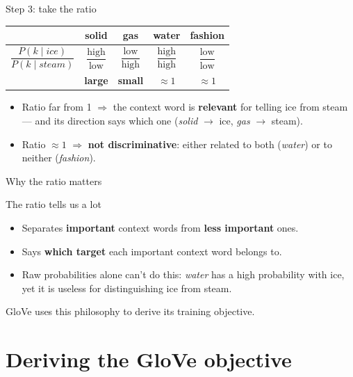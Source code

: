 \documentclass[aspectratio=169,11pt]{beamer}
\begin{document}
\begin{frame}{Step 3: take the ratio}
\centering
\begin{tabular}{@{}lcccc@{}}
\toprule
 & solid & gas & water & fashion \\
\midrule
$\dfrac{P(k \mid \textit{ice})}{P(k \mid \textit{steam})}$
  & $\dfrac{\text{high}}{\text{low}}$ & $\dfrac{\text{low}}{\text{high}}$
  & $\dfrac{\text{high}}{\text{high}}$ & $\dfrac{\text{low}}{\text{low}}$ \\[3mm]
  & \textcolor{okc}{\textbf{large}} & \textcolor{warn}{\textbf{small}}
  & $\approx 1$ & $\approx 1$ \\
\bottomrule
\end{tabular}

\vspace{4mm}
\raggedright
\begin{itemize}
  \item Ratio far from 1 $\Rightarrow$ the context word is \textbf{relevant}
        for telling ice from steam --- and its direction says which one
        (\emph{solid} $\to$ ice, \emph{gas} $\to$ steam).
  \item Ratio $\approx 1$ $\Rightarrow$ \textbf{not discriminative}: either
        related to both (\emph{water}) or to neither (\emph{fashion}).
\end{itemize}
\end{frame}

\begin{frame}{Why the ratio matters}
\begin{block}{The ratio tells us a lot}
\begin{itemize}
  \item Separates \textbf{important} context words from \textbf{less
        important} ones.
  \item Says \textbf{which target} each important context word belongs to.
  \item Raw probabilities alone can't do this: \emph{water} has a high
        probability with ice, yet it is useless for distinguishing ice
        from steam.
\end{itemize}
\end{block}
\vspace{2mm}
GloVe uses this philosophy to derive its training objective.
\end{frame}

\section{Deriving the GloVe objective}
\end{document}
